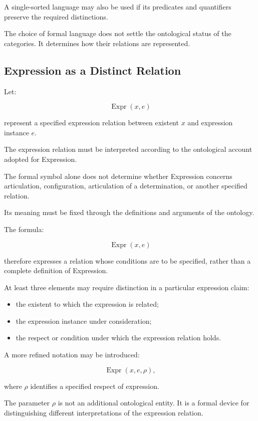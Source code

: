 A single-sorted language may also be
used if its predicates and quantifiers
preserve the required distinctions.

The choice of formal language does not
settle the ontological status of the
categories. It determines how their
relations are represented.

\subsection{Expression as a Distinct Relation}

Let:

\[
    \operatorname{Expr}(x,e)
\]

represent a specified expression relation
between existent \(x\) and expression
instance \(e\).

The expression relation must be interpreted
according to the ontological account
adopted for Expression.

The formal symbol alone does not determine
whether Expression concerns articulation,
configuration, articulation of a determination,
or another specified relation.

Its meaning must be fixed through the
definitions and arguments of the ontology.

The formula:

\[
    \operatorname{Expr}(x,e)
\]

therefore expresses a relation whose
conditions are to be specified, rather
than a complete definition of Expression.

At least three elements may require
distinction in a particular expression
claim:

\begin{itemize}
    \item the existent to which the
    expression is related;
    \item the expression instance under
    consideration;
    \item the respect or condition under
    which the expression relation holds.
\end{itemize}

A more refined notation may be introduced:

\[
    \operatorname{Expr}(x,e,\rho),
\]

where \(\rho\) identifies a specified
respect of expression.

The parameter \(\rho\) is not an
additional ontological entity. It is
a formal device for distinguishing
different interpretations of the
expression relation.

